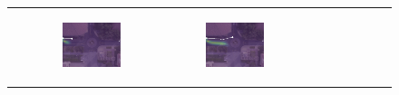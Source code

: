 \documentclass[letterpaper,10pt,conference]{ieeeconf}
\begin{document}
\begin{figure}
\begin{tabular}{M{.1\linewidth}  M{.3\linewidth} M{.3\linewidth}  M{.3\linewidth}}
	 & 
	\begin{subfigure}[b]{\linewidth}
		\includegraphics[width=\linewidth]{./figures/comparison/kit_death_1_2_t=70.png}
	\end{subfigure} &
	\begin{subfigure}[b]{\linewidth}
		\includegraphics[width=\linewidth]{./figures/comparison/kit_death_1_2_t=250.png}
	\end{subfigure} &
	\begin{subfigure}[b]{\linewidth}

\end{subfigure}
\end{tabular}
\end{figure}
\end{document}
